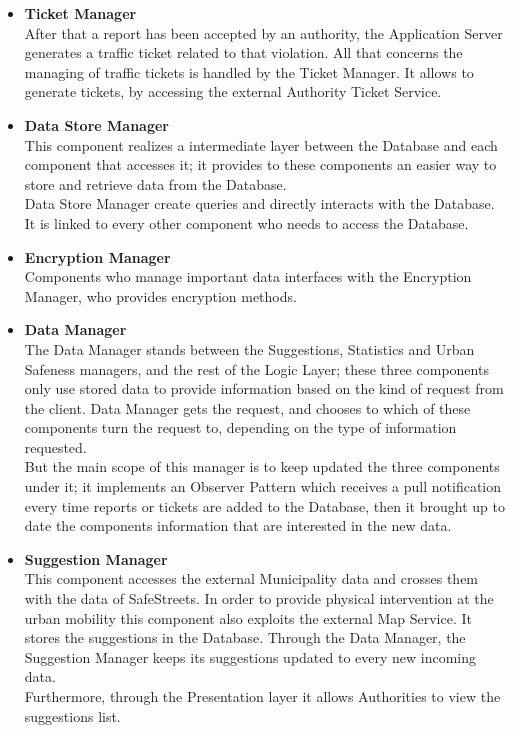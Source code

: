 \begin{itemize}
     
     \item\textbf{Ticket Manager}\\
     After that a report has been accepted by an authority, the Application Server generates a traffic ticket related to that violation. All that concerns the managing of traffic tickets is handled by the Ticket Manager. It allows to generate tickets, by accessing the external Authority Ticket Service.
     
     \item\textbf{Data Store Manager}\\
     This component realizes a intermediate layer between the Database and each component that accesses it; it provides to these components an easier way to store and retrieve data from the Database. \\
     Data Store Manager create queries and directly interacts with the Database. \\
     It is linked to every other component who needs to access the Database.
     
     \item\textbf{Encryption Manager}\\
     Components who manage important data interfaces with the Encryption Manager, who provides encryption methods.
     
     \item\textbf{Data Manager}\\
     The Data Manager stands between the Suggestions, Statistics and Urban Safeness managers, and the rest of the Logic Layer; these three components only use stored data to provide information based on the kind of request from the client. Data Manager gets the request, and chooses to which of these components turn the request to, depending on the type of information requested. \\
     But the main scope of this manager is to keep updated the three components under it; it implements an Observer Pattern which receives a pull notification every time reports or tickets are added to the Database, then it brought up to date the components information that are interested in the new data. 
     
     \item\textbf{Suggestion Manager}\\
     This component accesses the external Municipality data and crosses them with the data of SafeStreets. In order to provide physical intervention at the urban mobility this component also exploits the external Map Service.
     It stores the suggestions in the Database. Through the Data Manager, the Suggestion Manager keeps its suggestions updated to every new incoming data.\\
     Furthermore, through the Presentation layer it allows Authorities to view the suggestions list.
     

\end{itemize}
